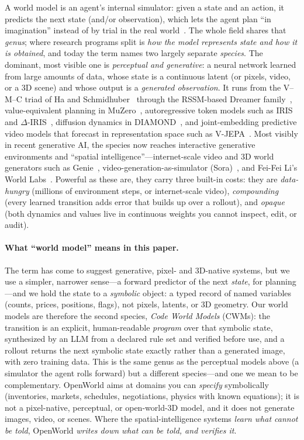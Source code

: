 \documentclass[11pt]{article}
\begin{document}
A world model is an agent's internal simulator: given a state and an action, it
predicts the next state (and/or observation), which lets the agent plan ``in
imagination'' instead of by trial in the real world~\cite{ha2018world}. The whole field shares that
\emph{genus}; where research programs split is \emph{how the
model represents state and how it is obtained}, and today the term names two largely
separate \emph{species}. The dominant, most visible one is \emph{perceptual and
generative}: a neural network learned from large amounts of data, whose state is a
continuous latent (or pixels, video, or a 3D scene) and whose output is a
\emph{generated observation}. It runs from the V--M--C triad of Ha and
Schmidhuber~\cite{ha2018world} through the RSSM-based Dreamer
family~\cite{dreamerv3}, value-equivalent planning in MuZero~\cite{muzero},
autoregressive token models such as IRIS~\cite{iris2023} and
$\Delta$-IRIS~\cite{deltairis2024}, diffusion dynamics in
DIAMOND~\cite{diamond2024}, and joint-embedding predictive video models that
forecast in representation space such as V-JEPA~\cite{vjepa2025}. Most
visibly in recent generative AI, the species now reaches interactive generative
environments and ``spatial intelligence''---internet-scale video and 3D world
generators such as Genie~\cite{genie2024}, video-generation-as-simulator
(Sora)~\cite{sora2024}, and Fei-Fei Li's World Labs~\cite{worldlabs2025}. Powerful as these are, they carry three built-in
costs: they are \emph{data-hungry} (millions of environment steps, or
internet-scale video), \emph{compounding} (every learned transition adds error
that builds up over a rollout), and \emph{opaque} (both dynamics and values
live in continuous weights you cannot inspect, edit, or audit).

\paragraph{What ``world model'' means in this paper.} The term has come to
suggest generative, pixel- and 3D-native systems, but we use a simpler, narrower sense---a
forward predictor of
the next \emph{state}, for planning---and we hold the state to a \emph{symbolic}
object: a typed record of named variables (counts, prices, positions, flags), not
pixels, latents, or 3D geometry. Our world models are therefore the second species,
\emph{Code World Models} (CWMs): the transition is an explicit, human-readable
\emph{program} over that symbolic state, synthesized by an LLM from a declared rule
set and verified before use, and a rollout returns the next symbolic state
exactly rather than a generated image, with zero training data. This
is the same genus as the perceptual models above (a simulator the agent rolls
forward) but a different species---and one we mean to be complementary.
OpenWorld aims at domains you can \emph{specify} symbolically (inventories,
markets, schedules, negotiations, physics with known equations); it is not a
pixel-native, perceptual, or open-world-3D model, and it does not generate images,
video, or scenes. Where the spatial-intelligence systems \emph{learn what cannot be
told}, OpenWorld \emph{writes down what can be told, and verifies it}.
\end{document}
